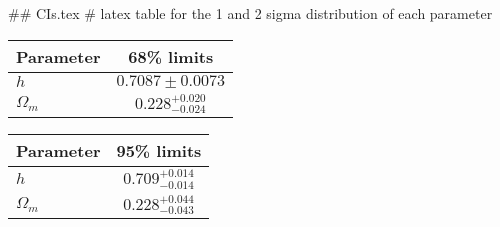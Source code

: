 ## CIs.tex
# latex table for the 1 and 2 sigma distribution of each parameter

\begin{tabular} { l  c}
 Parameter &  68\% limits\\
\hline
{\boldmath$h              $} & $0.7087\pm 0.0073          $\\
{\boldmath$\Omega_m       $} & $0.228^{+0.020}_{-0.024}   $\\
\hline
\end{tabular}

\begin{tabular} { l  c}
 Parameter &  95\% limits\\
\hline
{\boldmath$h              $} & $0.709^{+0.014}_{-0.014}   $\\
{\boldmath$\Omega_m       $} & $0.228^{+0.044}_{-0.043}   $\\
\hline
\end{tabular}
